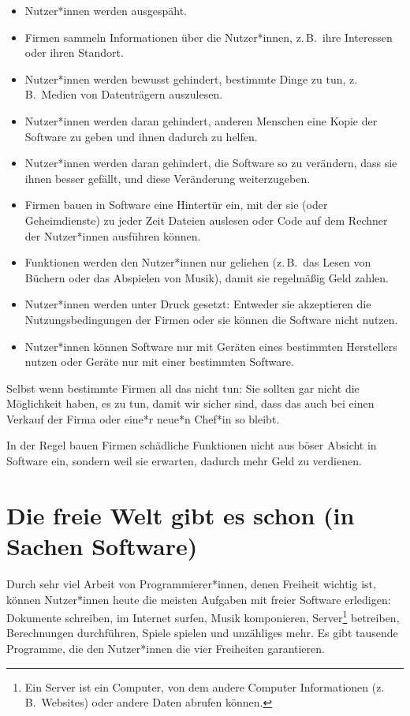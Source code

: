 \documentclass[a5paper,12pt]{scrartcl}
\begin{document}
\begin{itemize}
\item Nutzer*innen werden ausgespäht.
\item Firmen sammeln Informationen über die Nutzer*innen, z.\,B.\ ihre
  Interessen oder ihren Standort.
\item Nutzer*innen werden bewusst gehindert, bestimmte Dinge zu tun,
  z.\,B.\ Medien von Datenträgern auszulesen.
\item Nutzer*innen werden daran gehindert, anderen Menschen eine Kopie
  der Software zu geben und ihnen dadurch zu helfen.
\item Nutzer*innen werden daran gehindert, die Software so zu
  verändern, dass sie ihnen besser gefällt, und diese Veränderung
  weiterzugeben.
\item Firmen bauen in Software eine Hintertür ein, mit der sie (oder
  Geheimdienste) zu jeder Zeit Dateien auslesen oder Code auf dem
  Rechner der Nutzer*innen ausführen können.
\item Funktionen werden den Nutzer*innen nur geliehen (z.\,B.\ das
  Lesen von Büchern oder das Abspielen von Musik), damit sie
  regelmäßig Geld zahlen.
\item Nutzer*innen werden unter Druck gesetzt: Entweder sie
  akzeptieren die Nutzungsbedingungen der Firmen oder sie können die
  Software nicht nutzen.
\item Nutzer*innen können Software nur mit Geräten eines bestimmten
  Herstellers nutzen oder Geräte nur mit einer bestimmten Software.
\end{itemize}

Selbst wenn bestimmte Firmen all das nicht tun: Sie sollten gar nicht
die Möglichkeit haben, es zu tun, damit wir sicher sind, dass das auch
bei einen Verkauf der Firma oder eine*r neue*n Chef*in so bleibt.

In der Regel bauen Firmen schädliche Funktionen nicht aus böser
Absicht in Software ein, sondern weil sie erwarten, dadurch mehr Geld
zu verdienen.


\section{Die freie Welt gibt es schon (in Sachen Software)}

Durch sehr viel Arbeit von Programmierer*innen, denen Freiheit wichtig
ist, können Nutzer*innen heute die meisten Aufgaben mit freier
Software erledigen: Dokumente schreiben, im Internet surfen, Musik
komponieren, Server\footnote{Ein Server ist ein Computer, von dem
  andere Computer Informationen (z.\,B.\ Websites) oder andere Daten
  abrufen können.}  betreiben, Berechnungen durchführen, Spiele
spielen und unzähliges mehr. Es gibt tausende Programme, die den
Nutzer*innen die vier Freiheiten garantieren.
\end{document}
